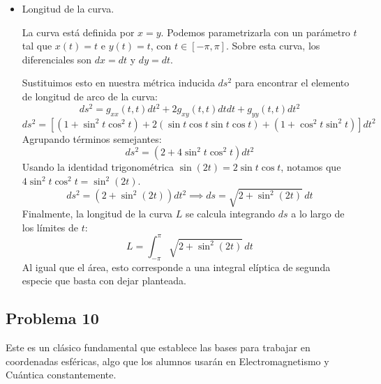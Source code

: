 \documentclass[11pt,spanish]{article}
\begin{document}
\begin{itemize}
Entonces, el diferencial de área escalar es:
$$dA = \sqrt{1 + \sin^2 x \cos^2 y + \cos^2 x \sin^2 y} \, dx \, dy$$

El área total del parche es la integral de este diferencial en la región dada:
$$
A = \int_{-\pi}^{\pi} \int_{-\pi}^{\pi} \sqrt{1 + \sin^2 x \cos^2 y + \cos^2 x \sin^2 y} \, dx \, dy
$$
Nota pedagógica: Esta es una integral elíptica que no tiene solución analítica en términos de funciones elementales, por lo que dejarla expresada es el resultado esperado en este punto, a menos que utilicen software para integración numérica en el curso.

\item Longitud de la curva.

La curva está definida por $x=y$. Podemos parametrizarla con un parámetro $t$ tal que $x(t) = t$ e $y(t) = t$, con $t \in [-\pi, \pi]$.
Sobre esta curva, los diferenciales son $dx = dt$ y $dy = dt$. 

Sustituimos esto en nuestra métrica inducida $ds^2$ para encontrar el elemento de longitud de arco de la curva:
$$
ds^2 = g_{xx}(t,t) dt^2 + 2g_{xy}(t,t) dt dt + g_{yy}(t,t) dt^2
$$
$$
ds^2 = \left[ (1 + \sin^2 t \cos^2 t) + 2(\sin t \cos t \sin t \cos t) + (1 + \cos^2 t \sin^2 t) \right] dt^2
$$
Agrupando términos semejantes:
$$
ds^2 = \left( 2 + 4\sin^2 t \cos^2 t \right) dt^2
$$
Usando la identidad trigonométrica $\sin(2t) = 2\sin t \cos t$, notamos que $4\sin^2 t \cos^2 t = \sin^2(2t)$.
$$
ds^2 = (2 + \sin^2(2t)) dt^2 \implies ds = \sqrt{2 + \sin^2(2t)} \, dt
$$
Finalmente, la longitud de la curva $L$ se calcula integrando $ds$ a lo largo de los límites de $t$:
$$
L = \int_{-\pi}^{\pi} \sqrt{2 + \sin^2(2t)} \, dt
$$
Al igual que el área, esto corresponde a una integral elíptica de segunda especie que basta con dejar planteada.

\end{itemize}

\subsection*{Problema 10}

Este es un clásico fundamental que establece las bases para trabajar en coordenadas esféricas, algo que los alumnos usarán en Electromagnetismo y Cuántica constantemente.
\end{document}
